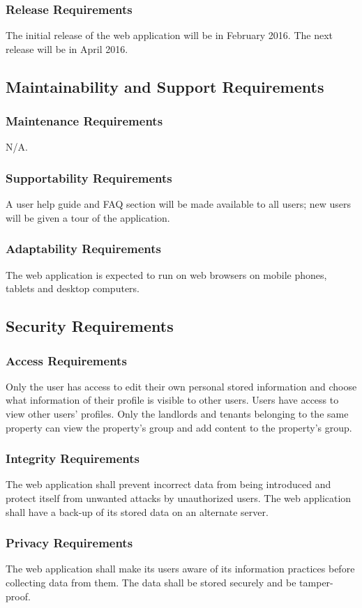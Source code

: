 \documentclass[12pt]{article}
\begin{document}
{\subsubsection{Release Requirements}
The initial release of the web application will be in February 2016. The next 
release will be in April 2016.
\subsection{Maintainability and Support Requirements}
\subsubsection{Maintenance Requirements}
N/A.
\subsubsection{Supportability Requirements}
A user help guide and FAQ section will be made available to all users; new users will be given a tour of the application.
\subsubsection{Adaptability Requirements}
The web application is expected to run on web browsers on mobile phones, tablets 
and desktop computers.
\subsection{Security Requirements}
\subsubsection{Access Requirements}
Only the user has access to edit their own personal stored information and 
choose what information of their profile is visible to other users. Users have 
access to view other users' profiles. Only the landlords and tenants belonging 
to the same property can view the property's group and add content to the 
property's group.
\subsubsection{Integrity Requirements}
The web application shall prevent incorrect data from being introduced and 
protect itself from unwanted attacks by unauthorized users. The web application 
shall have a back-up of its stored data on an alternate server.
\subsubsection{Privacy Requirements}
The web application shall make its users aware of its information practices 
before collecting data from them. The data shall be stored securely and be tamper-proof.
}
\end{document}
